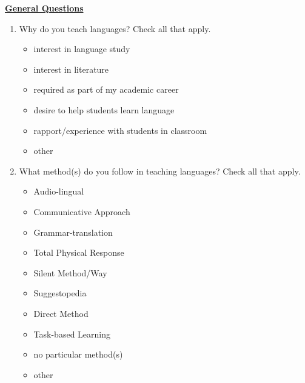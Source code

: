 \documentclass[letterpaper,10pt]{article}
\begin{document}
\newpage
\noindent \underline{\textbf{General Questions}}
\begin{enumerate}[resume]

\item Why do you teach languages? Check all that apply.
\vspace{-0.1in}\begin{multicols}{2}
\begin{itemize}
	\item interest in language study
	\item interest in literature
	\item required as part of my academic career
	\item desire to help students learn language
	\item rapport/experience with students in classroom 
	\item other \underline{\hspace{2in}}
\end{itemize}
\end{multicols}

\item What method(s) do you follow in teaching languages? Check all that apply. 
\vspace{-0.1in}\begin{multicols}{2}
\begin{itemize}
	\item Audio-lingual
	\item Communicative Approach
	\item Grammar-translation
	\item Total Physical Response
	\item Silent Method/Way
	\item Suggestopedia
	\item Direct Method
	\item Task-based Learning
	\item no particular method(s)
	\item other \underline{\hspace{2in}}
\end{itemize}
\end{multicols}


\end{enumerate}
\end{document}
